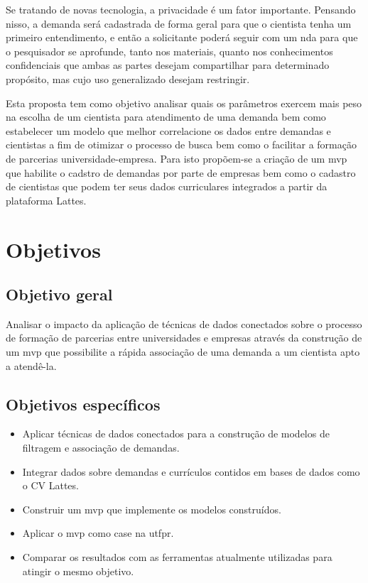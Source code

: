 Se tratando de novas tecnologia, a privacidade é um fator importante. Pensando nisso, a demanda será cadastrada de forma geral para que o cientista tenha um primeiro entendimento, e então a solicitante poderá seguir com um \gls{nda} para que o pesquisador se aprofunde, tanto nos materiais, quanto nos conhecimentos confidenciais que ambas as partes desejam compartilhar para determinado propósito, mas cujo uso generalizado desejam restringir.

Esta proposta tem como objetivo analisar quais os parâmetros exercem mais peso na escolha de um cientista para atendimento de uma demanda bem como estabelecer um modelo que melhor correlacione os dados entre demandas e cientistas a fim de otimizar o processo de busca bem como o facilitar a formação de parcerias universidade-empresa. Para isto propõem-se a criação de um \gls{mvp} que habilite o cadstro de demandas por parte de empresas bem como o cadastro de cientistas que podem ter seus dados curriculares integrados a partir da plataforma Lattes.

\section{Objetivos}\label{sec:objetivos}

\subsection{Objetivo geral}\label{subsec:objetivoGeral}

Analisar o impacto da aplicação de técnicas de dados conectados sobre o processo de formação de parcerias entre universidades e empresas através da construção de um \gls{mvp} que possibilite a rápida associação de uma demanda a um cientista apto a atendê-la.

\subsection{Objetivos específicos}\label{subsec:objetivosEspecificos}

\begin{itemize}
    \item Aplicar técnicas de dados conectados para a construção de modelos de filtragem e associação de demandas.
    \item Integrar dados sobre demandas e currículos contidos em bases de dados como o CV Lattes.
    \item Construir um \gls{mvp} que implemente os modelos construídos.
    \item Aplicar o \gls{mvp} como case na \gls{utfpr}.
    \item Comparar os resultados com as ferramentas atualmente utilizadas para atingir o mesmo objetivo.
\end{itemize}

